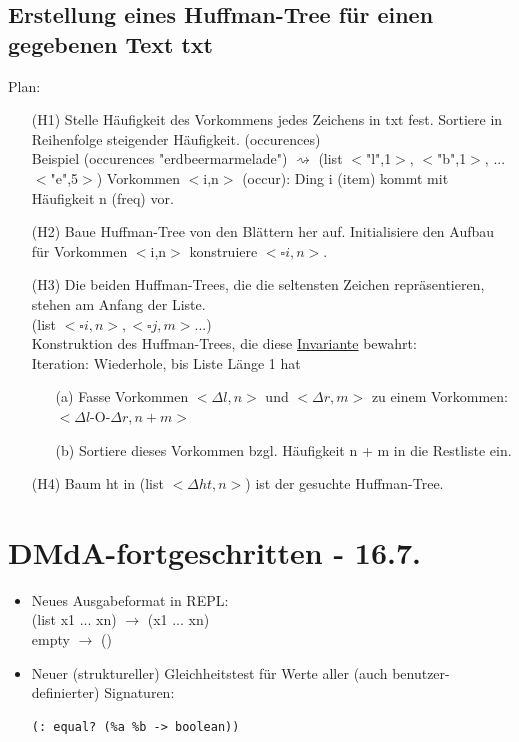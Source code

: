 \documentclass[a4paper, 20pt, openany]{book}
\begin{document}
\section{Erstellung eines Huffman-Tree für einen gegebenen Text txt} 
Plan:\\
\begin{enumerate}
\item[(H1)] Stelle Häufigkeit des Vorkommens jedes Zeichens in txt fest. Sortiere in Reihenfolge steigender Häufigkeit. (occurences)\\
Beispiel (occurences "erdbeermarmelade") $\rightsquigarrow$ (list $<$"l",1$>$, $<$"b",1$>$, ... $<$"e",5$>$) Vorkommen $<$i,n$>$ (occur): Ding i (item) kommt mit Häufigkeit n (freq) vor.
\item[(H2)] Baue Huffman-Tree von den Blättern her auf. Initialisiere den Aufbau für Vorkommen $<$i,n$>$ konstruiere $< \square i, n>$.
\item[(H3)] Die beiden Huffman-Trees, die die seltensten Zeichen repräsentieren, stehen am Anfang der Liste.\\
(list $< \square i, n>, <\square j,m>$...)\\
Konstruktion des Huffman-Trees, die diese \underline{Invariante} bewahrt:\\
Iteration: Wiederhole, bis Liste Länge 1 hat\\
\begin{enumerate}
\item[(a)] Fasse Vorkommen $< \Delta l, n>$ und $<\Delta r, m>$ zu einem Vorkommen: $< \Delta
l$-O-$\Delta r, n+m>$
\item[(b)] Sortiere dieses Vorkommen bzgl. Häufigkeit n + m in die Restliste ein.
\end{enumerate}
\item[(H4)] Baum ht in (list $< \Delta ht, n>$) ist der gesuchte Huffman-Tree.

\end{enumerate}

\chapter{DMdA-fortgeschritten - 16.7.}
\begin{itemize}
\item Neues Ausgabeformat in REPL:\\
(list x1 ... xn) $\rightarrow$ (x1 ... xn)\\
empty $\rightarrow$ ()
\item Neuer (struktureller) Gleichheitstest für Werte aller (auch benutzer-definierter) Signaturen:\\
\begin{lstlisting}
(: equal? (%a %b -> boolean))
\end{lstlisting}
\end{itemize}
\end{document}

